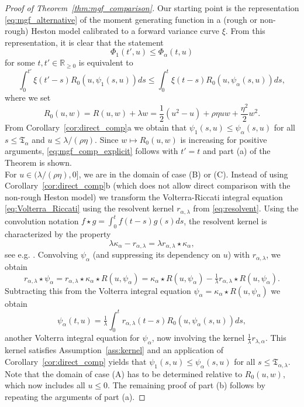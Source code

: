 \documentclass[12pt,a4paper]{amsart}
\numberwithin{equation}{section}
\numberwithin{equation}{section}
\theoremstyle{nonumberplain}
\newcommand{\Rplus}{\mathbb{R}_{\geq 0 }}
\begin{document}
\begin{proof}[Proof of Theorem~\ref{thm:mgf_comparison}]
Our starting point is the representation \eqref{eq:mgf_alternative} of the moment generating function in a (rough or non-rough) Heston model calibrated to a forward variance curve $\xi$. From this representation, it is clear that the statement 
\begin{equation}\label{eq:mgf_comp_generic}
\Phi_1(t',u) \le \Phi_\alpha(t,u)
\end{equation}
for some $t,t' \in \Rplus$ is equivalent to 
\begin{equation}\label{eq:mgf_comp_explicit}
\int_0^{t'} \xi(t'-s) R_0(u,\psi_1(s,u)) ds  \le \int_0^{t} \xi(t-s) R_0(u,\psi_\alpha(s,u)) ds,
\end{equation}
where we set
\begin{equation}\label{eq:R0}
R_0(u,w) = R(u,w) + \lambda w = \frac{1}{2}(u^2- u) + \rho \eta u w + \frac{\eta^2}{2}w^2.
\end{equation}
From Corollary~\ref{cor:direct_comp}a we obtain that $\psi_1(s,u) \le \psi_\alpha(s,u)$ for all $s \le \mathfrak{T}_\alpha$ and $u \le \lambda / (\rho \eta)$. Since $w \mapsto R_0(u,w)$ is increasing for positive arguments, \eqref{eq:mgf_comp_explicit} follows with $t'=t$ and part (a) of the Theorem is shown.\\
For $u \in (\lambda/(\rho \eta),0]$, we are in the domain of case (B) or (C). Instead of using Corollary~\ref{cor:direct_comp}b (which does not allow direct comparison with the non-rough Heston model) we transform the Volterra-Riccati integral equation \eqref{eq:Volterra_Riccati} using the resolvent kernel $r_{\alpha,\lambda}$ from \eqref{eq:resolvent}. Using the convolution notation $f \star g = \int_0^t f(t-s)g(s)ds$, the resolvent kernel is characterized by the property
\[\lambda \kappa_\alpha - r_{\alpha,\lambda} = \lambda r_{\alpha,\lambda} \star \kappa_\alpha,\]
see e.g. \cite[Ch.~2]{gripenberg1990volterra}. Convolving $\psi_\alpha$ (and suppressing its dependency on $u$) with $r_{\alpha,\lambda}$, we obtain
\[r_{\alpha,\lambda} \star \psi_\alpha =  r_{\alpha,\lambda} \star \kappa_\alpha \star R(u,\psi_\alpha) = \kappa_\alpha \star R(u,\psi_\alpha) - \tfrac{1}{\lambda} r_{\alpha,\lambda} \star R(u,\psi_\alpha).\]
Subtracting this from the Volterra integral equation $\psi_\alpha = \kappa_\alpha \star R(u,\psi_\alpha)$ we obtain
\begin{equation}\label{eq:volterra_resolvent}
\psi_\alpha(t,u) = \tfrac{1}{\lambda} \int_0^t r_{\alpha,\lambda}(t-s)R_0(u,\psi_\alpha(s,u))ds,
\end{equation}
another Volterra integral equation for $\psi_\alpha$, now involving the kernel $\tfrac{1}{\lambda} r_{\lambda,\alpha}$. This kernel satisfies Assumption~\ref{ass:kernel} and an application of Corollary~\ref{cor:direct_comp} yields that $\psi_1(s,u) \le \psi_\alpha(s,u)$ for all $s \le \mathfrak{T}_{\alpha,\lambda}$. Note that the domain of case (A) has to be determined relative to $R_0(u,w)$, which now includes all $u \le 0$. The remaining proof of part (b) follows by repeating the arguments of part (a).
\end{proof}
\end{document}
